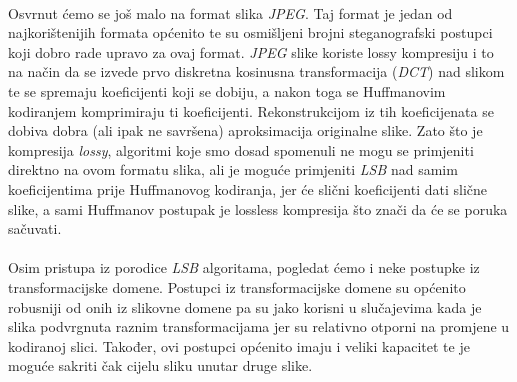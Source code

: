 \documentclass[times, utf8, seminar]{fer}
\begin{document}
\paragraph{}
Osvrnut ćemo se još malo na format slika \textit{JPEG}. Taj format je jedan od najkorištenijih formata općenito te su osmišljeni brojni steganografski postupci koji dobro rade upravo za ovaj format. \textit{JPEG} slike koriste lossy kompresiju i to na način da se izvede prvo diskretna kosinusna transformacija (\textit{DCT}) nad slikom te se spremaju koeficijenti koji se dobiju, a nakon toga se Huffmanovim kodiranjem komprimiraju ti koeficijenti. Rekonstrukcijom iz tih koeficijenata se dobiva dobra (ali ipak ne savršena) aproksimacija originalne slike. Zato što je kompresija \textit{lossy}, algoritmi koje smo dosad spomenuli ne mogu se primjeniti direktno na ovom formatu slika, ali je moguće primjeniti \textit{LSB} nad samim koeficijentima prije Huffmanovog kodiranja, jer će slični koeficijenti dati slične slike, a sami Huffmanov postupak je lossless kompresija što znači da će se poruka sačuvati.
\paragraph{}
Osim pristupa iz porodice \textit{LSB} algoritama, pogledat ćemo i neke postupke iz transformacijske domene. Postupci iz transformacijske domene su općenito robusniji od onih iz slikovne domene pa su jako korisni u slučajevima kada je slika podvrgnuta raznim transformacijama jer su relativno otporni na promjene u kodiranoj slici. Također, ovi postupci općenito imaju i veliki kapacitet te je moguće sakriti čak cijelu sliku unutar druge slike.
\end{document}

